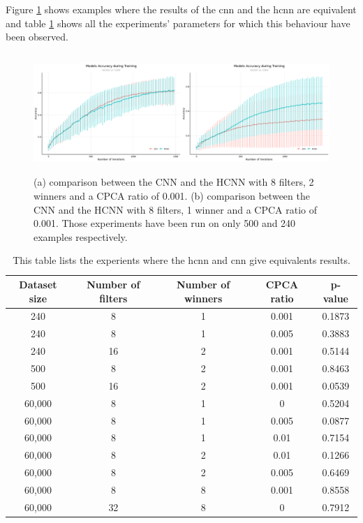\documentclass[11pt]{report}
\begin{document}
\noindent Figure \ref{fig:hcnn_equi} shows examples where the results of the \acrshort{cnn} and the \acrshort{hcnn} are equivalent and table \ref{table:hcnn_equi} shows all the experiments' parameters for which this behaviour have been observed.

\begin{figure}[h]
\centering
\includegraphics[width=12cm, height=4.5cm]{hcnn_equi}
\caption[Illustration of two experiments where the HCNN and CNN results are equivalent.]{(a) comparison between the CNN and the HCNN with 8 filters, 2 winners and a CPCA ratio of 0.001. (b) comparison between the CNN and the HCNN with 8 filters, 1 winner and a CPCA ratio of 0.001. Those experiments have been run on only 500 and 240 examples respectively.}
\label{fig:hcnn_equi}
\end{figure}

\begin{table}[h!]
\centering
\begin{tabular}{ c c c c c }
Dataset size & Number of filters & Number of winners & CPCA ratio & p-value\\
\hline
240 & 8 & 1 & 0.001 & 0.1873\\
240 & 8 & 1 & 0.005 & 0.3883\\
240 & 16 & 2 & 0.001 & 0.5144\\
500 & 8 & 2 & 0.001 & 0.8463\\
500 & 16 & 2 & 0.001 & 0.0539\\
60,000 & 8 & 1 & 0 & 0.5204\\
60,000 & 8 & 1 & 0.005 & 0.0877\\
60,000 & 8 & 1 & 0.01 & 0.7154\\
60,000 & 8 & 2 & 0.01 & 0.1266\\
60,000 & 8 & 2 & 0.005 & 0.6469\\
60,000 & 8 & 8 & 0.001 & 0.8558\\
60,000 & 32 & 8 & 0 & 0.7912
\end{tabular}
\caption[Benchmark where the \acrshort{hcnn} and the \acrshort{cnn} are equivalents.]{This table lists the experients where the \acrshort{hcnn} and \acrshort{cnn} give equivalents results.}
\label{table:hcnn_equi}
\end{table}
\end{document}
